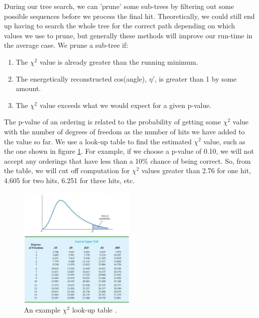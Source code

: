 During our tree search, we can 'prune' some sub-trees by filtering out some possible sequences before we process the final hit. Theoretically, we could still end up having to search the whole tree for the correct path depending on which values we use to prune, but generally these methods will improve our run-time in the average case. We prune a sub-tree if:
\begin{enumerate}
    \item The $\chi^2$ value is already greater than the running minimum.
    \item The energetically reconstructed cos(angle), $\eta'$, is greater than 1 by some amount.
    \item The $\chi^2$ value exceeds what we would expect for a given p-value.
\end{enumerate}
The p-value of an ordering is related to the probability of getting some $\chi^2$ value with the number of degrees of freedom as the number of hits we have added to the value so far. We use a look-up table to find the estimated $\chi^2$ value, such as the one shown in figure \ref{fig:p-val}. For example, if we choose a p-value of 0.10, we will not accept any orderings that have less than a 10\% chance of being correct. So, from the table, we will cut off computation for $\chi^2$ values greater than 2.76 for one hit, 4.605 for two hits, 6.251 for three hits, etc.

\begin{figure}
    \centering
    \includegraphics[width=0.5\textwidth]{chi2table.png}
    \caption{An example $\chi^2$ look-up table \cite{chitable}.}
    \label{fig:p-val}
\end{figure}


